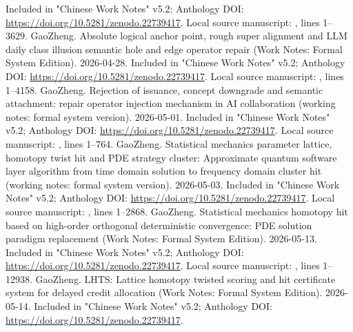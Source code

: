 \documentclass[11pt,a4paper]{article}
\theoremstyle{plain}
\theoremstyle{definition}
\theoremstyle{remark}
\begin{document}
\begin{CJK*}
\begin{thebibliography}
Included in "Chinese Work Notes" v5.2; Anthology DOI: \url{https://doi.org/10.5281/zenodo.22739417}.\newblock
Local source manuscript: , lines 1--3629.  GaoZheng. Absolute logical anchor point, rough super alignment and LLM daily class illusion semantic hole and edge operator repair (Work Notes: Formal System Edition). 2026-04-28.\newblock
Included in "Chinese Work Notes" v5.2; Anthology DOI: \url{https://doi.org/10.5281/zenodo.22739417}.\newblock
Local source manuscript: , lines 1--4158.  GaoZheng. Rejection of issuance, concept downgrade and semantic attachment: repair operator injection mechanism in AI collaboration (working notes: formal system version). 2026-05-01.\newblock
Included in "Chinese Work Notes" v5.2; Anthology DOI: \url{https://doi.org/10.5281/zenodo.22739417}.\newblock
Local source manuscript: , lines 1--764.  GaoZheng. Statistical mechanics parameter lattice, homotopy twist hit and PDE strategy cluster: Approximate quantum software layer algorithm from time domain solution to frequency domain cluster hit (working notes: formal system version). 2026-05-03.\newblock
Included in "Chinese Work Notes" v5.2; Anthology DOI: \url{https://doi.org/10.5281/zenodo.22739417}.\newblock
Local source manuscript: , lines 1--2868. 
GaoZheng. Statistical mechanics homotopy hit based on high-order orthogonal deterministic convergence: PDE solution paradigm replacement (Work Notes: Formal System Edition). 2026-05-13.\newblock
Included in "Chinese Work Notes" v5.2; Anthology DOI: \url{https://doi.org/10.5281/zenodo.22739417}.\newblock
Local source manuscript: , lines 1--12938.  GaoZheng. LHTS: Lattice homotopy twisted scoring and hit certificate system for delayed credit allocation (Work Notes: Formal System Edition). 2026-05-14.\newblock
Included in "Chinese Work Notes" v5.2; Anthology DOI: \url{https://doi.org/10.5281/zenodo.22739417}.\newblock

\end{thebibliography}
\end{CJK*}
\end{document}
